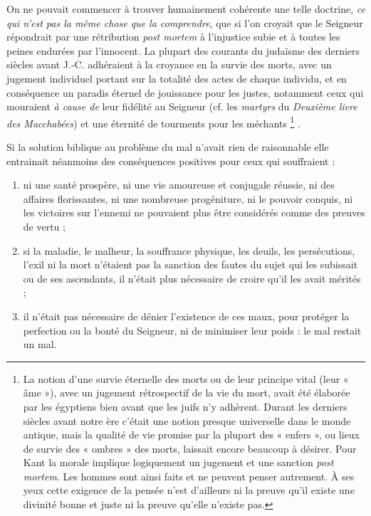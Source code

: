  On ne pouvait commencer à trouver humainement cohérente une telle doctrine, \emph{ce qui n'est pas la même chose que la comprendre}, que si l'on croyait que le Seigneur répondrait par une rétribution \emph{post mortem} à l'injustice subie et à toutes les peines endurées par l'innocent. La plupart des courants du judaïsme des derniers siècles avant J.-C. adhéraient à la croyance en la survie des morts, avec un jugement individuel portant sur la totalité des actes de chaque individu, et en conséquence un paradis éternel de jouissance pour les justes, notamment ceux qui mouraient \emph{à cause de} leur fidélité au Seigneur (cf. les \emph{martyrs} du \emph{Deuxième livre des Macchabées}) et une éternité de tourments pour les méchants%
\footnote{La notion d'une survie éternelle des morts ou de leur principe vital (leur « âme »), avec un jugement rétrospectif de la vie du mort, avait été élaborée par les égyptiens bien avant que les juifs n'y adhèrent. Durant les derniers siècles avant notre ère c'était une notion presque universelle dans le monde antique, mais la qualité de vie promise par la plupart des « enfers », ou lieux de survie des « ombres » des morts, laissait encore beaucoup à désirer. Pour Kant la morale implique logiquement un jugement et une sanction \emph{post mortem}. Les hommes sont ainsi faits et ne peuvent penser autrement. À ses yeux cette exigence de la pensée n'est d'ailleurs ni la preuve qu'il existe une divinité bonne et juste ni la preuve qu'elle n'existe pas.}%
.

 Si la solution biblique au problème du mal n'avait rien de raisonnable elle entrainait néanmoins des conséquences positives pour ceux qui souffraient :
\begin{enumerate}
\item ni une santé prospère, ni une vie amoureuse et conjugale réussie, ni des affaires florissantes, ni une nombreuse progéniture, ni le pouvoir conquis, ni les victoires sur l'ennemi ne pouvaient plus être considérés comme des preuves de vertu ;
\item si la maladie, le malheur, la souffrance physique, les deuils, les persécutions, l'exil ni la mort n'étaient pas la sanction des fautes du sujet qui les subissait ou de ses ascendants, il n'était plus nécessaire de croire qu'il les avait mérités ;
\item il n'était pas nécessaire de dénier l'existence de ces maux, pour protéger la perfection ou la bonté du Seigneur, ni de minimiser leur poids : le mal restait un mal.
\end{enumerate}

